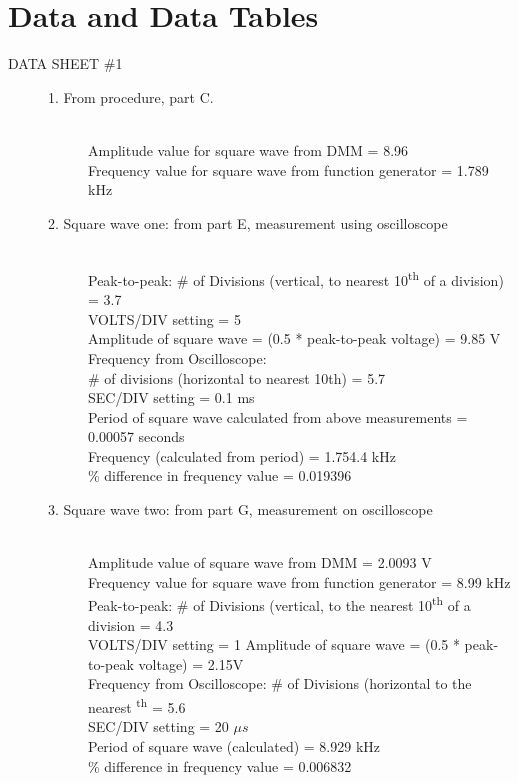 \documentclass{article}
\begin{document}
\section{Data and Data Tables}
\begin{description}
\item[DATA SHEET \#1] \hfill
\begin{description}
\item[1. From procedure, part C.] \hfill \\
Amplitude value for square wave from DMM = 8.96 \\
Frequency value for square wave from function generator = 1.789 kHz 
\item[2. Square wave one: from part E, measurement using oscilloscope] \hfill \\
Peak-to-peak: \# of Divisions (vertical, to nearest 10\textsuperscript{th} of a division) = 3.7 \\
VOLTS/DIV setting = 5 \\
Amplitude of square wave = (0.5 * peak-to-peak voltage) = 9.85 V \\
Frequency from Oscilloscope: \\
\# of divisions (horizontal to nearest 10th) = 5.7 \\
SEC/DIV setting = 0.1 ms \\
Period of square wave calculated from above measurements = 0.00057  seconds\\
Frequency (calculated from period) = 1.754.4 kHz\\
\% difference in frequency value  = 0.019396
\item[3. Square wave two: from part G, measurement on oscilloscope] \hfill \\
Amplitude value of square wave from DMM = 2.0093 V \\
Frequency value for square wave from function generator = 8.99 kHz \\
Peak-to-peak: \# of Divisions (vertical, to the nearest 10\textsuperscript{th} of a division = 4.3 \\
VOLTS/DIV setting = 1
Amplitude of square wave = (0.5 * peak-to-peak voltage) = 2.15V \\
Frequency from Oscilloscope: \# of Divisions (horizontal to the nearest \textsuperscript{th} = 5.6 \\
SEC/DIV setting = 20 $\mu s$ \\
Period of square wave (calculated) = 8.929 kHz \\
\% difference in frequency value  = 0.006832 

\end{description}
\end{description}
\end{document}
